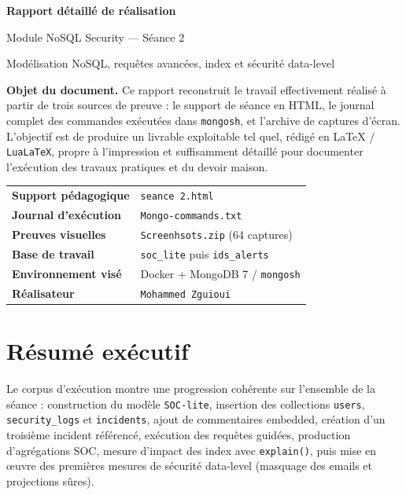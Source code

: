 \documentclass[11pt,a4paper]{article}
\begin{document}
\begin{titlepage}
\centering
{\Huge\bfseries\color{Primary} Rapport détaillé de réalisation\par}
\vspace{0.4cm}
{\LARGE Module NoSQL Security --- Séance 2\par}
\vspace{0.2cm}
{\large Modélisation NoSQL, requêtes avancées, index et sécurité data-level\par}
\vspace{1cm}

\begin{tcolorbox}[colback=white,colframe=Primary,boxrule=0.8pt,arc=2mm,width=0.92\textwidth]
\textbf{Objet du document.}
Ce rapport reconstruit le travail effectivement réalisé à partir de trois sources de preuve : le support de séance en HTML, le journal complet des commandes exécutées dans \texttt{mongosh}, et l'archive de captures d'écran. L'objectif est de produire un livrable exploitable tel quel, rédigé en \LaTeX{} / \texttt{LuaLaTeX}, propre à l'impression et suffisamment détaillé pour documenter l'exécution des travaux pratiques et du devoir maison.
\end{tcolorbox}

\vfill

\begin{tabular}{>{\bfseries}p{4.5cm}p{8.5cm}}
Support pédagogique & \texttt{seance 2.html} \\
Journal d'exécution & \texttt{Mongo-commands.txt} \\
Preuves visuelles & \texttt{Screenhsots.zip} (64 captures) \\
Base de travail & \texttt{soc\_lite} puis \texttt{ids\_alerts} \\
Environnement visé & Docker + MongoDB 7 / \texttt{mongosh} \\
Réalisateur & \texttt{Mohammed Zguioui}
\end{tabular}

\vfill
\end{titlepage}

\tableofcontents
\newpage

\section{Résumé exécutif}

\begin{summarybox}
Le corpus d'exécution montre une progression cohérente sur l'ensemble de la séance : construction du modèle \texttt{SOC-lite}, insertion des collections \texttt{users}, \texttt{security\_logs} et \texttt{incidents}, ajout de commentaires embedded, création d'un troisième incident référencé, exécution des requêtes guidées, production d'agrégations SOC, mesure d'impact des index avec \texttt{explain()}, puis mise en œuvre des premières mesures de sécurité data-level (masquage des emails et projections sûres).
\end{summarybox}
\end{document}

